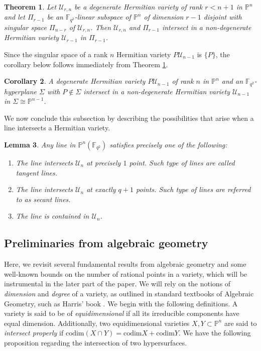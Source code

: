 \documentclass[10pt,a4paper,oneside]{amsproc}
\newtheorem{theorem}{Theorem}[section]
\newtheorem{corollary}[theorem]{Corollary}
\newtheorem{lemma}[theorem]{Lemma}
\newcommand{\codim}{\mathrm{codim}}
\newcommand{\Fqt}{\mathbb{F}_{q^2}}
\newcommand{\U}{\mathcal{U}}
\def\PP{{\mathbb P}}
\begin{document}
\begin{theorem}\cite[Theorem 7.1]{BC}\label{disjoint from sing sp}
   Let $\U_{r,n}$ be a degenerate Hermitian variety of rank $r<n+1$ in $\PP^n$ and let $\Pi_{r-1}$ be an $\Fqt$-linear subspace of $\PP^n$ of dimension $r-1$ disjoint with singular space $\Pi_{n-r}$ of $\U_{r,n}$. Then $\U_{r,n}$ and $\Pi_{r-1}$ intersect in a non-degenerate Hermitian variety $\U_{r-1}$ in $\Pi_{r-1}$.
\end{theorem}

Since the singular space of a rank $n$ Hermitian variety $P\U_{n-1}$ is $\{P\}$, the corollary below follows immediately from Theorem \ref{disjoint from sing sp}.
\begin{corollary}\label{hyp cup}
      A degenerate Hermitian variety $P\U_{n-1}$ of rank $n$ in $\PP^n$ and an $\Fqt$-hyperplane $\Sigma$ with $P\notin \Sigma$ intersect in a non-degenerate Hermitian variety $\U_{n-1}$ in $\Sigma\cong \PP^{n-1}$.
\end{corollary}

\noindent We now conclude this subsection by describing the possibilities that arise when a line intersects a Hermitian variety. 

\begin{lemma}\cite[Section 7]{BC}\label{line}
Any line in $\PP^n (\Fqt)$ satisfies precisely one of the following:
\begin{enumerate}
\item[(a)] The line intersects $\U_{n}$ at precisely $1$ point. Such type of lines are called \textit{tangent lines}.
\item[(b)] The line intersects $\U_n$ at exactly $q+1$ points. Such type of lines are referred to as \textit{secant lines}. 
\item[(c)] The line is contained in $\U_n$.
\end{enumerate}
\end{lemma}


\subsection{Preliminaries from algebraic geometry}\label{Prel from alg}

Here, we revisit several fundamental results from algebraic geometry and some well-known bounds on the number of rational points in a variety, which will be instrumental in the later part of the paper. We will rely on the notions of \textit{dimension} and \textit{degree} of a variety, as outlined in standard textbooks of Algebraic Geometry, such as Harris' book \cite{H}. We begin with the following definitions. A variety is said to be of \textit{equidimensional} if all its irreducible components have equal dimension. Additionally, two equidimensional varieties $X,Y\subset \PP^n$ are said to \textit{intersect properly} if $\codim(X\cap Y)=\codim X+\codim Y$.  We have the following proposition regarding the intersection of two hypersurfaces.
\end{document}
